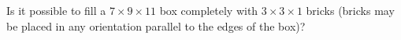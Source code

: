 Is it possible to fill a $7\times9\times11$ box completely with $3\times3\times1$ bricks (bricks may be placed in any orientation parallel to the edges of the box)?
